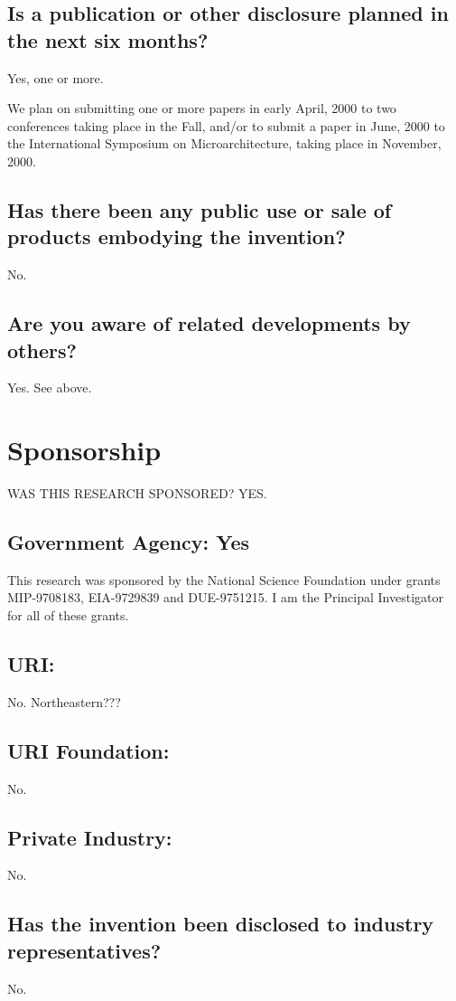 \documentclass[10pt,dvips]{article}
\begin{document}
\subsection{Is a publication or other disclosure planned in the next six months?}
Yes, one or more.

We plan on submitting one or more papers in early April, 2000 to two conferences taking
place in the Fall, and/or to submit a paper in June, 2000 to the International
Symposium on
Microarchitecture, taking place in November, 2000.

\subsection{Has there been any public use or sale of products embodying the invention?}
No.

\subsection{Are you aware of related developments by others?} Yes. See above.

\newpage

\section{Sponsorship}
WAS THIS RESEARCH SPONSORED?	YES.

\subsection{Government Agency: Yes}
This research was sponsored by the National Science Foundation under grants
MIP-9708183, EIA-9729839 and DUE-9751215. I am the Principal Investigator for
all of these grants.

\subsection{URI:} No. Northeastern???

\subsection{URI Foundation:} No.

\subsection{Private Industry:} No.

\subsection{Has the invention been disclosed to industry representatives?} No.
\end{document}
